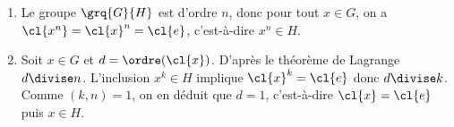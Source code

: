 \begin{enumerate}
  \item
    Le groupe $\grq{G}{H}$ est d'ordre $n$, donc pour tout $x\in G$, on a
    $\cl{x^n}=\cl{x}^n=\cl{e}$, c'est-à-dire $x^n\in H$.
  \item
    Soit $x\in G$ et $d=\ordre(\cl{x})$. D'après le théorème de Lagrange
    $d\divise n$. L'inclusion $x^k\in H$ implique $\cl{x}^k=\cl{e}$
    donc $d\divise k$. Comme $(k,n)=1$, on en déduit que $d=1$, c'est-à-dire
    $\cl{x}=\cl{e}$ puis $x\in H$.
\end{enumerate}
